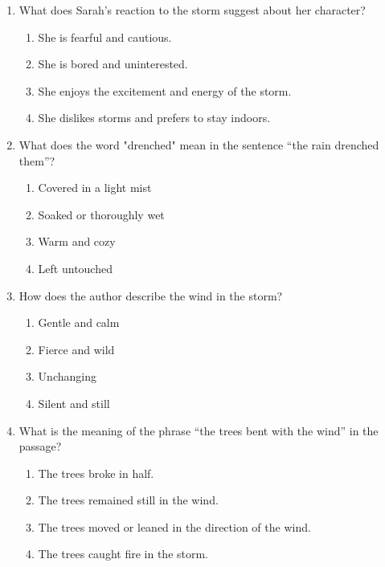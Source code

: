 \documentclass[12pt]{article}
\begin{document}
\begin{enumerate}
\vspace{0.5cm}

\item What does Sarah’s reaction to the storm suggest about her character?

\begin{enumerate}[label=\Alph*.]
    \item She is fearful and cautious.
    \item She is bored and uninterested.
    \item She enjoys the excitement and energy of the storm.
    \item She dislikes storms and prefers to stay indoors.
\end{enumerate}

\vspace{0.5cm}

\item What does the word "drenched" mean in the sentence “the rain drenched them”?

\begin{enumerate}[label=\Alph*.]
    \item Covered in a light mist
    \item Soaked or thoroughly wet
    \item Warm and cozy
    \item Left untouched
\end{enumerate}

\vspace{0.5cm}

\item How does the author describe the wind in the storm?

\begin{enumerate}[label=\Alph*.]
    \item Gentle and calm
    \item Fierce and wild
    \item Unchanging
    \item Silent and still
\end{enumerate}

\vspace{0.5cm}

\item What is the meaning of the phrase “the trees bent with the wind” in the passage?

\begin{enumerate}[label=\Alph*.]
    \item The trees broke in half.
    \item The trees remained still in the wind.
    \item The trees moved or leaned in the direction of the wind.
    \item The trees caught fire in the storm.
\end{enumerate}


\end{enumerate}
\end{document}
